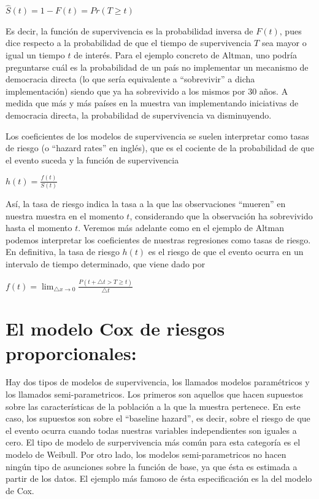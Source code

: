 \documentclass[]{book}
\begin{document}
\(\hat S(t)= 1-F(t)=Pr(T\geq t)\)

Es decir, la función de supervivencia es la probabilidad inversa de
\(F(t)\), pues dice respecto a la probabilidad de que el tiempo de
supervivencia \(T\) sea mayor o igual un tiempo \(t\) de interés. Para
el ejemplo concreto de Altman, uno podría preguntarse cuál es la
probabilidad de un país no implementar un mecanismo de democracia
directa (lo que sería equivalente a ``sobrevivir'' a dicha
implementación) siendo que ya ha sobrevivido a los mismos por 30 años. A
medida que más y más países en la muestra van implementando iniciativas
de democracia directa, la probabilidad de supervivencia va disminuyendo.

Los coeficientes de los modelos de supervivencia se suelen interpretar
como tasas de riesgo (o ``hazard rates'' en inglés), que es el cociente
de la probabilidad de que el evento suceda y la función de supervivencia

\(h(t)=\frac{f(t)}{S(t)}\)

Así, la tasa de riesgo indica la tasa a la que las observaciones
``mueren'' en nuestra muestra en el momento \(t\), considerando que la
observación ha sobrevivido hasta el momento \(t\). Veremos más adelante
como en el ejemplo de Altman podemos interpretar los coeficientes de
nuestras regresiones como tasas de riesgo. En definitiva, la tasa de
riesgo \(h(t)\) es el riesgo de que el evento ocurra en un intervalo de
tiempo determinado, que viene dado por

\(f(t)=\lim_{\bigtriangleup x \to 0} \frac {P(t+\bigtriangleup t > T \geq t)}{\bigtriangleup t}\)

\section{El modelo Cox de riesgos
proporcionales:}\label{el-modelo-cox-de-riesgos-proporcionales}

Hay dos tipos de modelos de supervivencia, los llamados modelos
paramétricos y los llamados semi-parametricos. Los primeros son aquellos
que hacen supuestos sobre las características de la población a la que
la muestra pertenece. En este caso, los supuestos son sobre el
``baseline hazard'', es decir, sobre el riesgo de que el evento ocurra
cuando todas nuestras variables independientes son iguales a cero. El
tipo de modelo de surpervivencia más común para esta categoría es el
modelo de Weibull. Por otro lado, los modelos semi-parametricos no hacen
ningún tipo de asunciones sobre la función de base, ya que ésta es
estimada a partir de los datos. El ejemplo más famoso de ésta
especificación es la del modelo de Cox.
\end{document}
